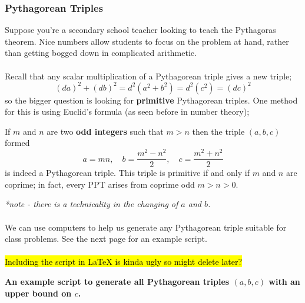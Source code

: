 \documentclass[12pt]{article}
\begin{document}
\subsubsection{Pythagorean Triples}
Suppose you're a secondary school teacher looking to teach the Pythagoras theorem. Nice numbers allow students to focus on the problem at hand, rather than getting bogged down in complicated arithmetic.\\\\
Recall that any scalar multiplication of a Pythagorean triple gives a new triple;
\begin{equation*}
    (da)^2 + (db)^2 = d^2(a^2 + b^2) = d^2(c^2) = (dc)^2
\end{equation*}
so the bigger question is looking for \textbf{primitive} Pythagorean triples. One method for this is using Euclid's formula (as seen before in number theory);
\begin{thm}{}{}
If $m$ and $n$ are two \textbf{odd integers} such that $m > n$ then the triple $(a, b, c)$ formed
\begin{equation*}
    a = mn,\quad b = \frac{m^2 - n^2}{2},\quad c = \frac{m^2 + n^2}{2}
\end{equation*}
is indeed a Pythagorean triple. This triple is primitive if and only if $m$ and $n$ are coprime; in fact, every PPT arises from coprime odd $m > n > 0$.
\end{thm}
\textit{*note - there is a technicality in the changing of $a$ and $b$.}\\\\
We can use computers to help us generate any Pythagorean triple suitable for class problems. See the next page for an example script.\\\\
\hl{Including the script in \LaTeX{} is kinda ugly so might delete later?}

\pagebreak 
\noindent \textbf{An example script to generate all Pythagorean triples $(a, b, c)$ with an upper bound on $c$.}
\end{document}

